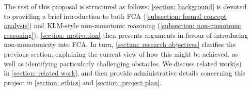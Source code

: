 
The rest of this proposal is structured as follows: \cref{section: background} is devoted to providing a brief introduction to both FCA (\cref{subsection: formal concept analysis}) and KLM-style non-monotonic reasoning (\cref{subsection: non-monotonic reasoning}). \cref{section: motivation} then presents arguments in favour of introducing non-monotonicity into FCA. In turn, \cref{section: research objectives} clarifies the previous section, explaining the current view of how this might be achieved, as well as identifying particularly challenging obstacles. We discuss related work(s) in \cref{section: related work}, and then provide administrative details concerning this project in \cref{section: ethics} and \cref{section: project plan}.


